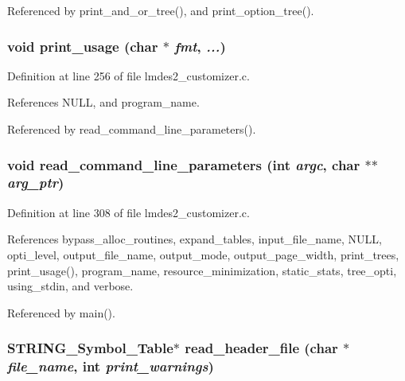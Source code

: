 Referenced by print\_\-and\_\-or\_\-tree(), and print\_\-option\_\-tree().
\subsubsection{\setlength{\rightskip}{0pt plus 5cm}void print\_\-usage (char $\ast$ {\em fmt},  {\em ...})}\label{lmdes2__customizer_8c_62ac7a1cfa066f61a3317977c936b8f2}




Definition at line 256 of file lmdes2\_\-customizer.c.

References NULL, and program\_\-name.

Referenced by read\_\-command\_\-line\_\-parameters().
\subsubsection{\setlength{\rightskip}{0pt plus 5cm}void read\_\-command\_\-line\_\-parameters (int {\em argc}, char $\ast$$\ast$ {\em arg\_\-ptr})}\label{lmdes2__customizer_8c_b5ad1e75f3e95a8372855846f911efe1}




Definition at line 308 of file lmdes2\_\-customizer.c.

References bypass\_\-alloc\_\-routines, expand\_\-tables, input\_\-file\_\-name, NULL, opti\_\-level, output\_\-file\_\-name, output\_\-mode, output\_\-page\_\-width, print\_\-trees, print\_\-usage(), program\_\-name, resource\_\-minimization, static\_\-stats, tree\_\-opti, using\_\-stdin, and verbose.

Referenced by main().
\subsubsection{\setlength{\rightskip}{0pt plus 5cm}\bf{STRING\_\-Symbol\_\-Table}$\ast$ read\_\-header\_\-file (char $\ast$ {\em file\_\-name}, int {\em print\_\-warnings})}\label{lmdes2__customizer_8c_33574aec74728b493ce42679b1c18d10}




